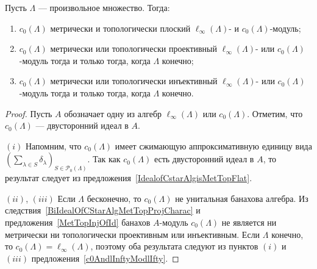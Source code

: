 \begin{proposition}\label{c0AndlInftyModc0} Пусть $\Lambda$ --- произвольное
множество. Тогда:

\begin{enumerate}[label = (\roman*)]
    \item $c_0(\Lambda)$ метрически и топологически плоский 
    $\ell_\infty(\Lambda)$- и $c_0(\Lambda)$-модуль;

    \item $c_0(\Lambda)$ метрически или топологически проективный
    $\ell_\infty(\Lambda)$- или $c_0(\Lambda)$-модуль тогда и только тогда, 
    когда $\Lambda$ конечно;

    \item $c_0(\Lambda)$ метрически или топологически инъективный
    $\ell_\infty(\Lambda)$- или $c_0(\Lambda)$-модуль тогда и только тогда, 
    когда $\Lambda$ конечно.
\end{enumerate}
\end{proposition}
\begin{proof} Пусть $A$ обозначает одну из алгебр $\ell_\infty(\Lambda)$ или
$c_0(\Lambda)$. Отметим, что $c_0(\Lambda)$ --- двусторонний идеал в $A$. 

$(i)$ Напомним, что $c_0(\Lambda)$ имеет сжимающую аппроксимативную единицу вида
${(\sum_{\lambda\in S}\delta_\lambda)}_{S\in\mathcal{P}_0(\Lambda)}$. Так как
$c_0(\Lambda)$ есть двусторонний идеал в $A$, то результат следует из
предложения~\ref{IdealofCstarAlgisMetTopFlat}.

$(ii)$, $(iii)$ Если $\Lambda$ бесконечно, то $c_0(\Lambda)$ не унитальная
банахова алгебра. Из следствия~\ref{BiIdealOfCStarAlgMetTopProjCharac} и
предложения~\ref{MetTopInjOfId} банахов $A$-модуль $c_0(\Lambda)$ не является ни
метрически ни топологически проективным или инъективным. Если $\Lambda$ конечно,
то $c_0(\Lambda)=\ell_\infty(\Lambda)$, поэтому оба результата следуют из
пунктов $(i)$ и $(iii)$ предложения~\ref{c0AndlInftyModlIfty}.
\end{proof}

